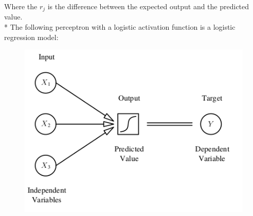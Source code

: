 \documentclass[10pt,a4paper]{article}
\begin{document}
Where the $r_j$ is the difference between the expected output and the predicted value.\\*
	The following perceptron with a logistic activation function is a logistic regression model:
		\begin{figure}[h!]
		\centering
		\includegraphics[scale=1.4]{img/logreg}
	\end{figure}
\end{document}
